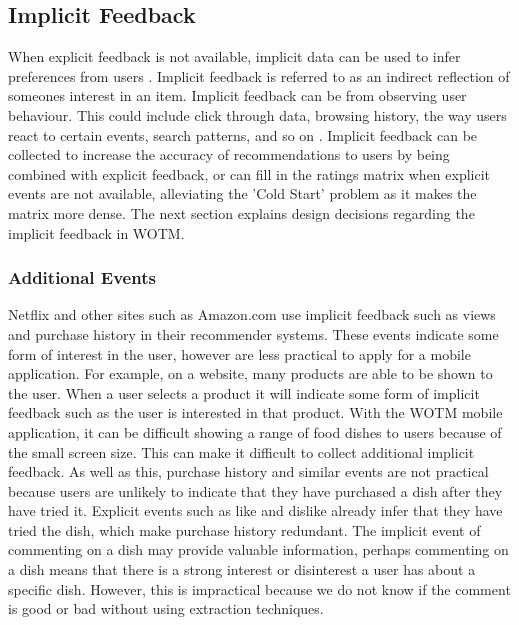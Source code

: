 \subsection{Implicit Feedback}

When explicit feedback is not available, implicit data can be used to infer preferences from users \cite{koren2009matrix}. Implicit feedback is referred to as an indirect reflection of someones interest in an item. Implicit feedback can be from observing user behaviour. This could include click through data, browsing history, the way users react to certain events, search patterns, and so on \cite{koren2009matrix}. Implicit feedback can be collected to increase the accuracy of recommendations to users by being combined with explicit feedback, or can fill in the ratings matrix when explicit events are not available, alleviating the 'Cold Start' problem as it makes the matrix more dense. The next section explains design decisions regarding the implicit feedback in WOTM.

\subsubsection{Additional Events}

Netflix \cite{koren2009matrix} and other sites such as Amazon.com \cite{schafer2007collaborative} use implicit feedback such as views and purchase history in their recommender systems. These events indicate some form of interest in the user, however are less practical to apply for a mobile application. For example, on a website, many products are able to be shown to the user. When a user selects a product it will indicate some form of implicit feedback such as the user is interested in that product. With the WOTM mobile application, it can be difficult showing a range of food dishes to users because of the small screen size. This can make it difficult to collect additional implicit feedback. As well as this, purchase history and similar events are not practical because users are unlikely to indicate that they have purchased a dish after they have tried it. Explicit events such as like and dislike already infer that they have tried the dish, which make purchase history redundant. The implicit event of commenting on a dish may provide valuable information, perhaps commenting on a dish means that there is a strong interest or disinterest a user has about a specific dish. However, this is impractical because we do not know if the comment is good or bad without using extraction techniques.

